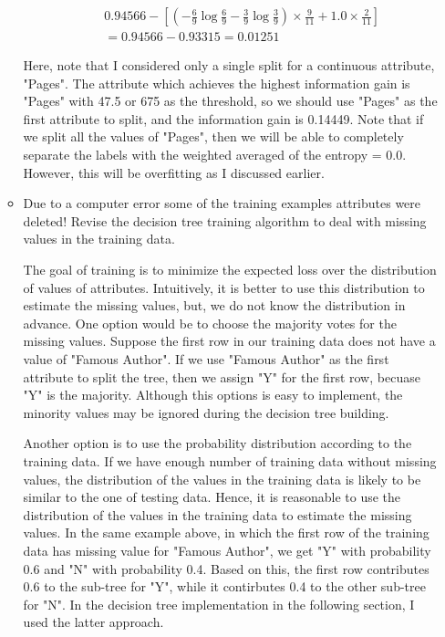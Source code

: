 \begin{enumerate}
\begin{itemize}
\begin{itemize}
\begin{eqnarray*}
0.94566 - \left[ \left( -\frac{6}{9} \log \frac{6}{9} -\frac{3}{9} \log \frac{3}{9} \right) \times \frac{9}{11} + 1.0 \times \frac{2}{11} \right]\\ = 0.94566 - 0.93315 = 0.01251
\end{eqnarray*}
\end{itemize}
Here, note that I considered only a single split for a continuous attribute, "Pages". The attribute which achieves the highest information gain is "Pages" with 47.5 or 675 as the threshold, so we should use "Pages" as the first attribute to split, and the information gain is 0.14449.
Note that if we split all the values of "Pages", then we will be able to completely separate the labels with the weighted averaged of the entropy = 0.0. However, this will be overfitting as I discussed earlier.

\item Due to a computer error some of the training examples attributes were deleted! Revise the decision tree training algorithm to deal with missing values in the training data.

The goal of training is to minimize the expected loss over the distribution of values of attributes. Intuitively, it is better to use this distribution to estimate the missing values, but, we do not know the distribution in advance. One option would be to choose the majority votes for the missing values. Suppose the first row in our training data does not have a value of "Famous Author". If we use "Famous Author" as the first attribute to split the tree, then we assign "Y" for the first row, becuase "Y" is the majority. Although this options is easy to implement, the minority values may be ignored during the decision tree building.

Another option is to use the probability distribution according to the training data. If we have enough number of training data without missing values, the distribution of the values in the training data is likely to be similar to the one of testing data. Hence, it is reasonable to use the distribution of the values in the training data to estimate the missing values. In the same example above, in which the first row of the training data has missing value for "Famous Author", we get "Y" with probability 0.6 and "N" with probability 0.4. Based on this, the first row contributes 0.6 to the sub-tree for "Y", while it contirbutes 0.4 to the other sub-tree for "N". In the decision tree implementation in the following section, I used the latter approach.
\end{itemize}


\end{enumerate}
